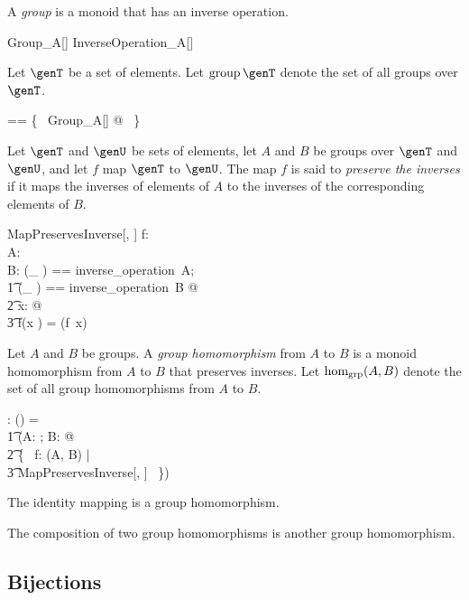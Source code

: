 \documentclass{amsart}
\begin{document}
A {\em group} is a monoid that has an inverse operation.
\begin{schema}{Group\_A}[\genT]
	InverseOperation\_A[\genT]
\end{schema}

Let $\genT$ be a set of elements.
Let $\group \genT$ denote the set of all groups over $\genT$.
\begin{zed}
	\group \genT == \{~ Group\_A[\genT] @ \strucA ~\}
\end{zed}

Let $\genT$ and $\genU$ be sets of elements,
let $A$ and $B$ be groups over $\genT$ and $\genU$, 
and let $f$ map $\genT$ to $\genU$.
The map $f$ is said to {\em preserve the inverses} if it maps the inverses of elements of $A$
to the inverses of the corresponding elements of $B$.
\begin{schema}{MapPreservesInverse}[\genT, \genU]
	f: \genT \pfun \genU \\
	A: \group \genT \\	
	B: \group \genU
\where
	\LET (\_ \invG) == inverse\_operation~A; \\
	\t1	(\_ \daggerG) == inverse\_operation~B @ \\
	\t2		\forall x: \genT @ \\
	\t3			f(x \invG) = (f~x) \daggerG
\end{schema}

Let $A$ and $B$ be groups.
A {\em group homomorphism} from $A$ to $B$ is a monoid homomorphism
from $A$ to $B$ that preserves inverses.
Let $\operatorname{hom_{grp}}(A, B)$ denote the set of all group homomorphisms from $A$ to $B$.
\begin{gendef}[\genT, \genU]
	\homGroup: \group \genT \cross \group \genU \fun \power (\genT \fun \genU)
\where
	\homGroup = \\
	\t1	(\lambda A: \group \genT; B: \group \genU @ \\
	\t2		\{~ f: \homMonoid(A, B) | \\
	\t3			MapPreservesInverse[\genT, \genU] ~\})
\end{gendef}

\begin{remark}
The identity mapping is a group homomorphism.
\end{remark}

\begin{remark}
The composition of two group homomorphisms is another group homomorphism.
\end{remark}

\subsection{Bijections}
\end{document}
